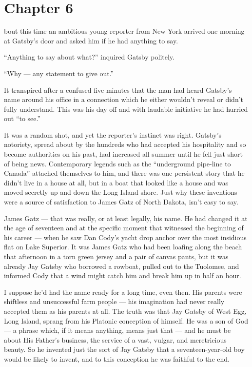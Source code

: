 \documentclass{znotebook}
\begin{document}
\chapter{Chapter 6}

\lettrine[findent=2pt]{}{ }bout this time an ambitious young reporter from New York arrived one morning at Gatsby's door and asked him if he had anything to say.

``Anything to say about what?'' inquired Gatsby politely.

``Why ---{} any statement to give out.''

It transpired after a confused five minutes that the man had heard Gatsby's name around his office in a connection which he either wouldn't reveal or didn't fully understand. This was his day off and with laudable initiative he had hurried out ``to see.''

It was a random shot, and yet the reporter's instinct was right. Gatsby's notoriety, spread about by the hundreds who had accepted his hospitality and so become authorities on his past, had increased all summer until he fell just short of being news. Contemporary legends such as the ``underground pipe-line to Canada'' attached themselves to him, and there was one persistent story that he didn't live in a house at all, but in a boat that looked like a house and was moved secretly up and down the Long Island shore. Just why these inventions were a source of satisfaction to James Gatz of North Dakota, isn't easy to say.

James Gatz ---{} that was really, or at least legally, his name. He had changed it at the age of seventeen and at the specific moment that witnessed the beginning of his career ---{} when he saw Dan Cody's yacht drop anchor over the most insidious flat on Lake Superior. It was James Gatz who had been loafing along the beach that afternoon in a torn green jersey and a pair of canvas pants, but it was already Jay Gatsby who borrowed a rowboat, pulled out to the Tuolomee, and informed Cody that a wind might catch him and break him up in half an hour.

I suppose he'd had the name ready for a long time, even then. His parents were shiftless and unsuccessful farm people ---{} his imagination had never really accepted them as his parents at all. The truth was that Jay Gatsby of West Egg, Long Island, sprang from his Platonic conception of himself. He was a son of God ---{} a phrase which, if it means anything, means just that ---{} and he must be about His Father's business, the service of a vast, vulgar, and meretricious beauty. So he invented just the sort of Jay Gatsby that a seventeen-year-old boy would be likely to invent, and to this conception he was faithful to the end.
\end{document}
